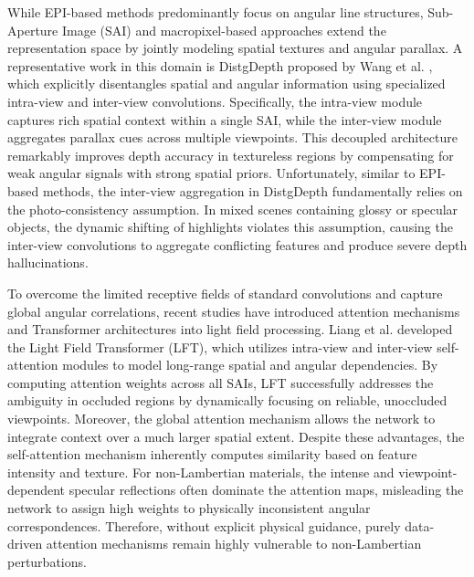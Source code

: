 \documentclass[lettersize,journal]{IEEEtran}
\begin{document}
While EPI-based methods predominantly focus on angular line structures, Sub-Aperture Image (SAI) and macropixel-based approaches extend the representation space by jointly modeling spatial textures and angular parallax. A representative work in this domain is DistgDepth proposed by Wang et al. \cite{Wang,DistgDepth}, which explicitly disentangles spatial and angular information using specialized intra-view and inter-view convolutions. Specifically, the intra-view module captures rich spatial context within a single SAI, while the inter-view module aggregates parallax cues across multiple viewpoints. This decoupled architecture remarkably improves depth accuracy in textureless regions by compensating for weak angular signals with strong spatial priors. Unfortunately, similar to EPI-based methods, the inter-view aggregation in DistgDepth fundamentally relies on the photo-consistency assumption. In mixed scenes containing glossy or specular objects, the dynamic shifting of highlights violates this assumption, causing the inter-view convolutions to aggregate conflicting features and produce severe depth hallucinations.

To overcome the limited receptive fields of standard convolutions and capture global angular correlations, recent studies have introduced attention mechanisms and Transformer architectures into light field processing. Liang et al. \cite{Liang,Light_Field_Transformer} developed the Light Field Transformer (LFT), which utilizes intra-view and inter-view self-attention modules to model long-range spatial and angular dependencies. By computing attention weights across all SAIs, LFT successfully addresses the ambiguity in occluded regions by dynamically focusing on reliable, unoccluded viewpoints. Moreover, the global attention mechanism allows the network to integrate context over a much larger spatial extent. Despite these advantages, the self-attention mechanism inherently computes similarity based on feature intensity and texture. For non-Lambertian materials, the intense and viewpoint-dependent specular reflections often dominate the attention maps, misleading the network to assign high weights to physically inconsistent angular correspondences. Therefore, without explicit physical guidance, purely data-driven attention mechanisms remain highly vulnerable to non-Lambertian perturbations.
\end{document}
